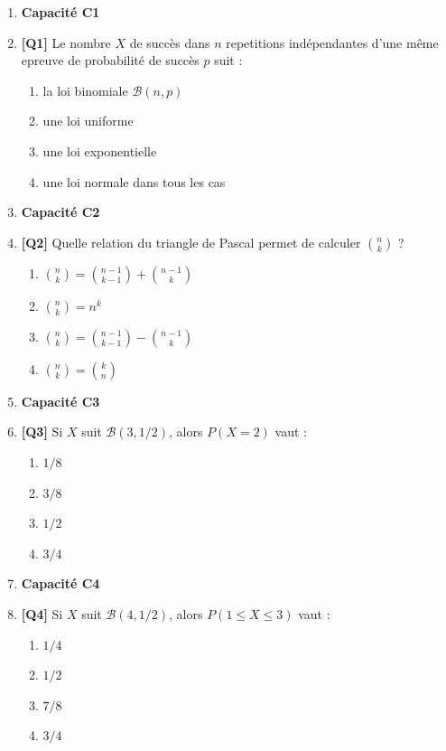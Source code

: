 \begin{enumerate}

\item[] \textbf{Capacité C1}

\item \textbf{[Q1]} Le nombre $X$ de succès dans $n$ repetitions indépendantes d'une même epreuve de probabilité de succès $p$ suit :
  \begin{enumerate}[label=\Alph*.]
    \item la loi binomiale $\mathcal B(n,p)$
    \item une loi uniforme
    \item une loi exponentielle
    \item une loi normale dans tous les cas
  \end{enumerate}

\item[] \textbf{Capacité C2}

\item \textbf{[Q2]} Quelle relation du triangle de Pascal permet de calculer $\binom{n}{k}$ ?
  \begin{enumerate}[label=\Alph*.]
    \item $\binom{n}{k}=\binom{n-1}{k-1}+\binom{n-1}{k}$
    \item $\binom{n}{k}=n^k$
    \item $\binom{n}{k}=\binom{n-1}{k-1}-\binom{n-1}{k}$
    \item $\binom{n}{k}=\binom{k}{n}$
  \end{enumerate}

\item[] \textbf{Capacité C3}

\item \textbf{[Q3]} Si $X$ suit $\mathcal B(3,1/2)$, alors $P(X=2)$ vaut :
  \begin{enumerate}[label=\Alph*.]
    \item $1/8$
    \item $3/8$
    \item $1/2$
    \item $3/4$
  \end{enumerate}

\item[] \textbf{Capacité C4}

\item \textbf{[Q4]} Si $X$ suit $\mathcal B(4,1/2)$, alors $P(1\leq X\leq3)$ vaut :
  \begin{enumerate}[label=\Alph*.]
    \item $1/4$
    \item $1/2$
    \item $7/8$
    \item $3/4$
  \end{enumerate}


\end{enumerate}
